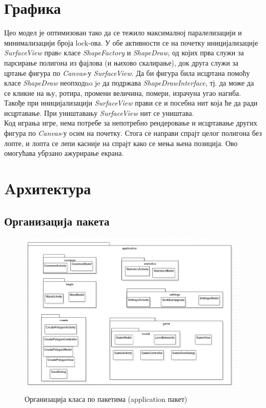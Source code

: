 \section{Графика}\label{Graphics}
 Цео модел је оптимизован тако да се тежило максималној паралелизацији и минимализацији броја lock-ова. У обе активности се на почетку иницијализације \emph{SurfaceView} правe класе \emph{ShapeFactory} и \emph{ShapeDraw}, од којих прва служи за парсирање полигона из фајлова (и њихово скалирање), док друга служи за цртање фигура по \emph{Canvas}-у \emph{SurfaceView}. Да би фигура била исцртана помоћу класе \emph{ShapeDraw} неопходno je да подржава \emph{ShapeDrawInterface}, тј. да може да се кликне на њу, ротира, промени величина, помери, израчуна угао нагиба. Такође при иницијализацији \emph{SurfaceView} прави се и посебна нит која ће да ради исцртавање. При уништавању \emph{SurfaceView} нит се уништава.
\\ \indent
Код играња игре, нема потребе за непотребно рендеровање и исцртавање других фигура по \emph{Canvas}-у осим на почетку. Стога се направи спрајт целог полигона без лопте, и лопта се лепи касније на спрајт како се мења њена позиција. Ово омогућава убрзано ажурирање екрана.

\section{Aрхитектура} \label{Architecture}

\subsection{Организација пакета}

\begin{figure}[htb!]
\begin{center}
\includegraphics[scale=.7]{pictures/UML/package/application}
\caption{Организација класа по пакетима (application пакет)}\label{fig:umlPackageApp}
\end{center}
\end{figure}

